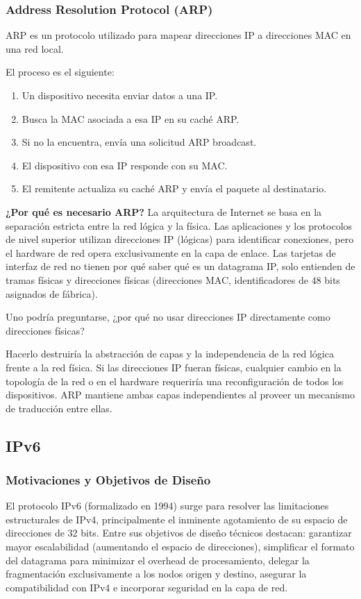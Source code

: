 \subsubsection{Address Resolution Protocol (ARP)}

ARP es un protocolo utilizado para mapear direcciones IP a direcciones MAC en una red local.

El proceso es el siguiente:
\begin{enumerate}
  \item Un dispositivo necesita enviar datos a una IP.
  \item Busca la MAC asociada a esa IP en su caché ARP.
  \item Si no la encuentra, envía una solicitud ARP broadcast.
  \item El dispositivo con esa IP responde con su MAC.
  \item El remitente actualiza su caché ARP y envía el paquete al destinatario.
\end{enumerate}


\textbf{¿Por qué es necesario ARP?} La arquitectura de Internet se basa en la separación estricta entre la red lógica y la física. Las aplicaciones y los protocolos de nivel superior utilizan direcciones IP (lógicas) para identificar conexiones, pero el hardware de red opera exclusivamente en la capa de enlace. Las tarjetas de interfaz de red no tienen por qué saber qué es un datagrama IP, solo entienden de tramas físicas y direcciones físicas (direcciones MAC, identificadores de 48 bits asignados de fábrica).

Uno podría preguntarse, ¿por qué no usar direcciones IP directamente como direcciones físicas? 

Hacerlo destruiría la abstracción de capas y la independencia de la red lógica frente a la red física. Si las direcciones IP fueran físicas, cualquier cambio en la topología de la red o en el hardware requeriría una reconfiguración de todos los dispositivos. ARP mantiene ambas capas independientes al proveer un mecanismo de traducción entre ellas.

\subsection{IPv6}

\subsubsection{Motivaciones y Objetivos de Diseño}
El protocolo IPv6 (formalizado en 1994) surge para resolver las limitaciones estructurales de IPv4, principalmente el inminente agotamiento de su espacio de direcciones de 32 bits. Entre sus objetivos de diseño técnicos destacan: garantizar mayor escalabilidad (aumentando el espacio de direcciones), simplificar el formato del datagrama para minimizar el overhead de procesamiento, delegar la fragmentación exclusivamente a los nodos origen y destino, asegurar la compatibilidad con IPv4 e incorporar seguridad en la capa de red.


